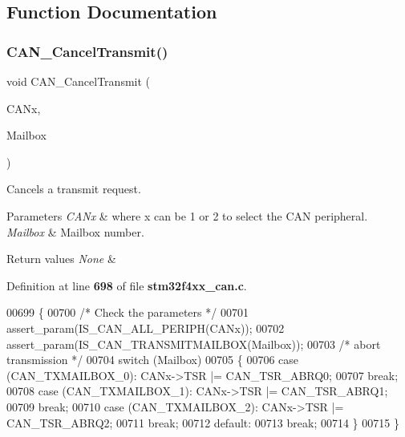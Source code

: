 \subsection{Function Documentation}
\mbox{\label{group__CAN__Group2_ga81106cdf5395a1947bfc87ec1685829e}} 
\subsubsection{C\+A\+N\+\_\+\+Cancel\+Transmit()}
{\footnotesize\ttfamily void C\+A\+N\+\_\+\+Cancel\+Transmit (\begin{DoxyParamCaption}\item[{\textbf{ C\+A\+N\+\_\+\+Type\+Def} $\ast$}]{C\+A\+Nx,  }\item[{uint8\+\_\+t}]{Mailbox }\end{DoxyParamCaption})}



Cancels a transmit request. 


\begin{DoxyParams}{Parameters}
{\em C\+A\+Nx} & where x can be 1 or 2 to select the C\+AN peripheral. \\
\hline
{\em Mailbox} & Mailbox number. \\
\hline
\end{DoxyParams}

\begin{DoxyRetVals}{Return values}
{\em None} & \\
\hline
\end{DoxyRetVals}


Definition at line \textbf{ 698} of file \textbf{ stm32f4xx\+\_\+can.\+c}.


\begin{DoxyCode}
00699 \{
00700   \textcolor{comment}{/* Check the parameters */}
00701   assert_param(IS_CAN_ALL_PERIPH(CANx));
00702   assert_param(IS_CAN_TRANSMITMAILBOX(Mailbox));
00703   \textcolor{comment}{/* abort transmission */}
00704   \textcolor{keywordflow}{switch} (Mailbox)
00705   \{
00706     \textcolor{keywordflow}{case} (CAN_TXMAILBOX_0): CANx->TSR |= CAN_TSR_ABRQ0;
00707       \textcolor{keywordflow}{break};
00708     \textcolor{keywordflow}{case} (CAN_TXMAILBOX_1): CANx->TSR |= CAN_TSR_ABRQ1;
00709       \textcolor{keywordflow}{break};
00710     \textcolor{keywordflow}{case} (CAN_TXMAILBOX_2): CANx->TSR |= CAN_TSR_ABRQ2;
00711       \textcolor{keywordflow}{break};
00712     \textcolor{keywordflow}{default}:
00713       \textcolor{keywordflow}{break};
00714   \}
00715 \}
\end{DoxyCode}
\mbox{\label{group__CAN__Group2_gaccfcb81f76f58400077c7b2d8641dd83}} 
